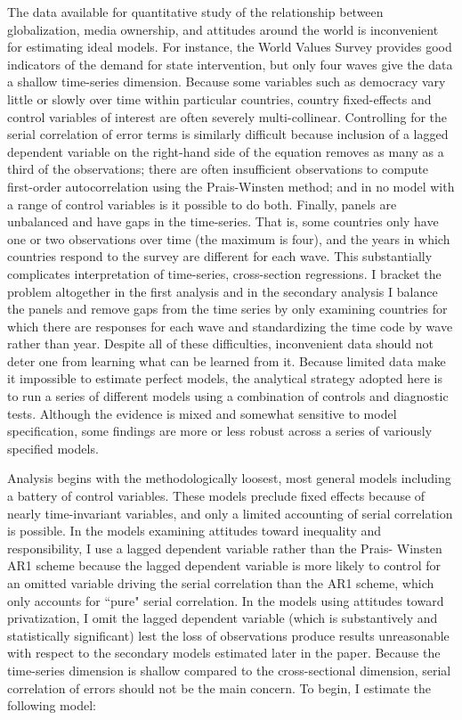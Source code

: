 \documentclass[12pt]{report}
\begin{document}
The data available for quantitative study of the relationship between globalization, media
ownership, and attitudes around the world is inconvenient for estimating ideal models. For
instance, the World Values Survey provides good indicators of the demand for state intervention,
but only four waves give the data a shallow time-series dimension. Because some variables such
as democracy vary little or slowly over time within particular countries, country fixed-effects
and control variables of interest are often severely multi-collinear. Controlling for the serial
correlation of error terms is similarly difficult because inclusion of a lagged dependent
variable on the right-hand side of the equation removes as many as a third of the observations;
there are often insufficient observations to compute first-order autocorrelation using the
Prais-Winsten method; and in no model with a range of control variables is it possible to do
both. Finally, panels are unbalanced and have gaps in the time-series. That is, some countries
only have one or two observations over time (the maximum is four), and the years in which
countries respond to the survey are different for each wave. This substantially complicates
interpretation of time-series, cross-section regressions. I bracket the problem altogether in
the first analysis and in the secondary analysis I balance the panels and remove gaps from the
time series by only examining countries for which there are responses for each wave and
standardizing the time code by wave rather than year. Despite all of these difficulties,
inconvenient data should not deter one from learning what can be learned from it. Because
limited data make it impossible to estimate perfect models, the analytical strategy adopted here
is to run a series of different models using a combination of controls and diagnostic tests.
Although the evidence is mixed and somewhat sensitive to model specification, some findings are
more or less robust across a series of variously specified models.

Analysis begins with the methodologically loosest, most general models including a battery of
control variables. These models  preclude fixed effects because of nearly time-invariant variables,
and only a limited accounting of serial correlation is possible. In the models examining attitudes
toward inequality and responsibility, I use a lagged dependent variable rather than the Prais-
Winsten AR1 scheme because the lagged dependent variable is more likely to control for an omitted
variable driving the serial correlation than the AR1 scheme, which only accounts for ``pure" serial
correlation. In the models using attitudes toward privatization, I omit the lagged dependent
variable (which is substantively and statistically significant) lest the loss of observations
produce results unreasonable with respect to the secondary models estimated later in the paper.
Because the time-series dimension is shallow compared to the cross-sectional dimension, serial
correlation of errors should not be the main concern. To begin, I estimate the following model:
\end{document}
